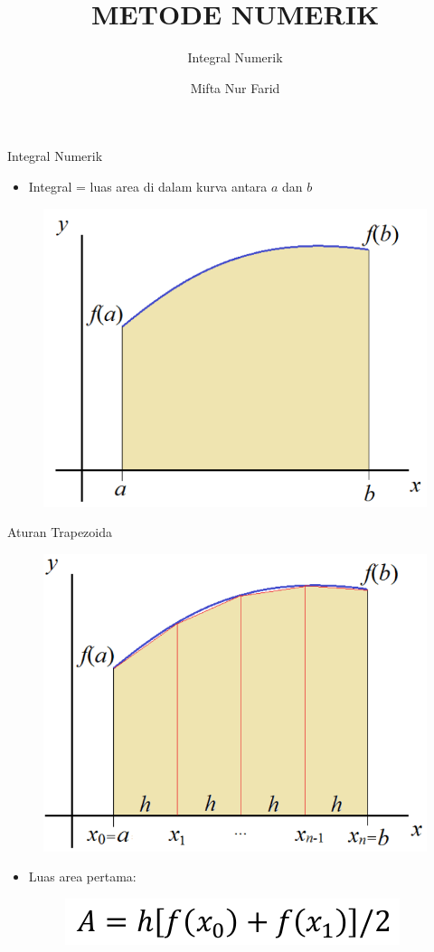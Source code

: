 \documentclass[pdflatex,compress,mathserif]{beamer}
\title{METODE NUMERIK}
\subtitle{Integral Numerik}
\author{Mifta Nur Farid}
\begin{document}
\maketitle

\begin{frame}{Integral Numerik}
    \begin{itemize}
        \item Integral = luas area di dalam kurva antara $a$ dan $b$
    \end{itemize}
    \begin{figure}
        \centering
        \includegraphics[width=0.7\linewidth]{./img/img01.png}
    \end{figure}
\end{frame}

\begin{frame}{Aturan Trapezoida}
    \begin{figure}
        \centering
        \includegraphics[width=0.6\linewidth]{./img/img02.png}
    \end{figure}
    \begin{itemize}
        \item Luas area pertama:
        \begin{figure}
            \centering
            \includegraphics[width=0.4\linewidth]{./img/img03.png}
        \end{figure}
    \end{itemize}
\end{frame}
\end{document}

